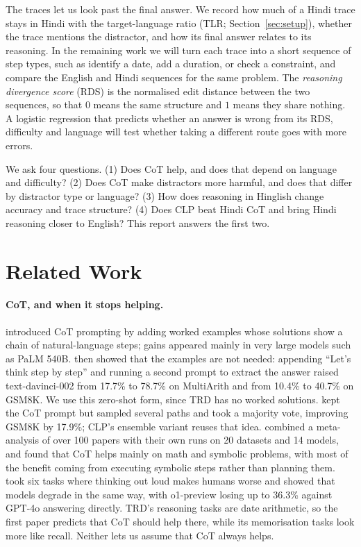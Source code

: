 \documentclass[11pt]{article}
\begin{document}
The traces let us look past the final answer. We record how much of a Hindi trace stays in Hindi with the target-language ratio (TLR; Section~\ref{sec:setup}), whether the trace mentions the distractor, and how its final answer relates to its reasoning. In the remaining work we will turn each trace into a short sequence of step types, such as identify a date, add a duration, or check a constraint, and compare the English and Hindi sequences for the same problem. The \emph{reasoning divergence score} (RDS) is the normalised edit distance between the two sequences, so that $0$ means the same structure and $1$ means they share nothing. A logistic regression that predicts whether an answer is wrong from its RDS, difficulty and language will test whether taking a different route goes with more errors.

We ask four questions. (1) Does CoT help, and does that depend on language and difficulty? (2) Does CoT make distractors more harmful, and does that differ by distractor type or language? (3) How does reasoning in Hinglish change accuracy and trace structure? (4) Does CLP beat Hindi CoT and bring Hindi reasoning closer to English? This report answers the first two.

\section{Related Work}
\label{sec:related}

\paragraph{CoT, and when it stops helping.}
\citet{wei-etal-2022-chain} introduced CoT prompting by adding worked examples whose solutions show a chain of natural-language steps; gains appeared mainly in very large models such as PaLM 540B. \citet{kojima2022large} then showed that the examples are not needed: appending ``Let's think step by step'' and running a second prompt to extract the answer raised text-davinci-002 from 17.7\% to 78.7\% on MultiArith and from 10.4\% to 40.7\% on GSM8K. We use this zero-shot form, since TRD has no worked solutions. \citet{wang2023selfconsistency} kept the CoT prompt but sampled several paths and took a majority vote, improving GSM8K by 17.9\%; CLP's ensemble variant reuses that idea. \citet{sprague2025cot} combined a meta-analysis of over 100 papers with their own runs on 20 datasets and 14 models, and found that CoT helps mainly on math and symbolic problems, with most of the benefit coming from executing symbolic steps rather than planning them. \citet{liu2025mind} took six tasks where thinking out loud makes humans worse and showed that models degrade in the same way, with o1-preview losing up to 36.3\% against GPT-4o answering directly. TRD's reasoning tasks are date arithmetic, so the first paper predicts that CoT should help there, while its memorisation tasks look more like recall. Neither lets us assume that CoT always helps.
\end{document}
